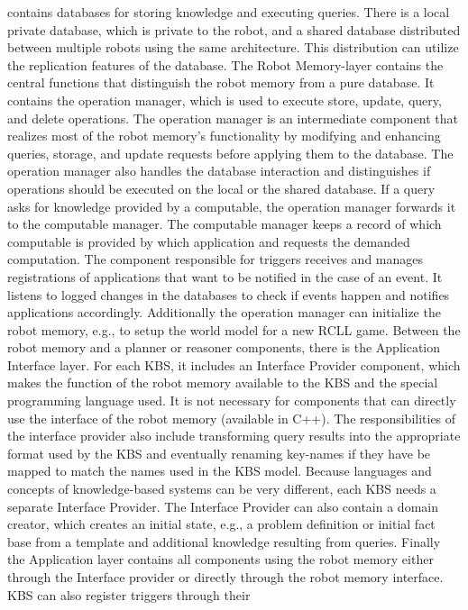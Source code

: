 contains databases for storing knowledge and executing queries. There
is a local private database, which is private to the robot, and a
shared database distributed between multiple robots using the same
architecture. This distribution can utilize the replication features
of the database. The Robot Memory-layer contains the central functions
that distinguish the robot memory from a pure database. It contains
the operation manager, which is used to execute store, update, query,
and delete operations. The operation manager is an intermediate
component that realizes most of the robot memory's functionality by
modifying and enhancing queries, storage, and update requests before
applying them to the database. The operation manager also handles the
database interaction and distinguishes if operations should be
executed on the local or the shared database.  If a query asks for
knowledge provided by a computable, the operation manager forwards it
to the computable manager. The computable manager keeps a record of
which computable is provided by which application and requests the
demanded computation. The component responsible for triggers
receives and manages registrations of applications that want to be
notified in the case of an event. It listens to logged changes in the
databases to check if events happen and notifies applications
accordingly. Additionally the operation manager can initialize the
robot memory, e.g., to setup the world model for a new RCLL game.
Between the robot memory and a planner or reasoner components, there
is the Application Interface layer. For each KBS, it includes an
Interface Provider component, which makes the function of the robot
memory available to the KBS and the special programming language
used. It is not necessary for components that can directly use the
interface of the robot memory (available in C++). The responsibilities
of the interface provider also include transforming query results into
the appropriate format used by the KBS and eventually renaming
key-names if they have be mapped to match the names used in the KBS
model. Because languages and concepts of knowledge-based systems can
be very different, each KBS needs a separate Interface Provider. The
Interface Provider can also contain a domain creator, which creates an
initial state, e.g., a problem definition or initial fact base from a
template and additional knowledge resulting from queries. Finally the
Application layer contains all components using the robot memory
either through the Interface provider or directly through the robot
memory interface. KBS can also register triggers through their
